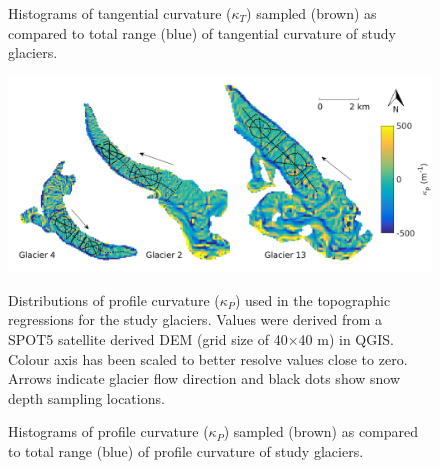 \documentclass[12pt]{article}
\newcommand{\topomap}{Arrows indicate glacier flow direction and black dots show snow depth sampling locations. }
\begin{document}
\begin{figure}[H]
	\caption{Histograms of tangential curvature ($\kappa_T$) sampled (brown) as compared to total range (blue) of tangential curvature of study glaciers.}
	\label{sampledRange:tangentC}
\end{figure}

\begin{figure}[H]
	\centering
	\includegraphics[width=\textwidth]{Map_profileCurve.png}\\
	\caption{Distributions of profile curvature ($\kappa_P$) used in the topographic regressions for the study glaciers. Values were derived from a SPOT5 satellite derived DEM (grid size of 40$\times$40 m) in QGIS. Colour axis has been scaled to better resolve values close to zero. \topomap}
	\label{map:profileC}
\end{figure}

\begin{figure}[H]
	\caption{Histograms of profile curvature ($\kappa_P$) sampled (brown) as compared to total range (blue) of profile curvature of study glaciers.}
	\label{sampledRange:profileC}
\end{figure}
\end{document}
